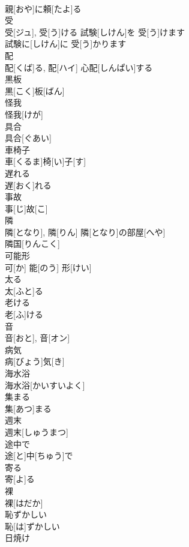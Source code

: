\documentclass[8pt]{extreport}
\begin{document}
\begin{CJK}{UTF8}{min}
\\	親[おや]に頼[たよ]る 
\\	受	
\\	受[ジュ], 受[う]ける	試験[しけん]を 受[う]けます 
\\	試験に[しけん]に 受[う]かります 
\\	配	
\\	配[くば]る, 配[ハイ]	心配[しんぱい]する　
\\	黒板	
\\	黒[こく]板[ばん]	
\\	怪我	
\\	怪我[けが]	
\\	具合	
\\	具合[ぐあい]	
\\	車椅子	
\\	車[くるま]椅[い]子[す]	
\\	遅れる	
\\	遅[おく]れる	
\\	事故	
\\	事[じ]故[こ]	
\\	隣	
\\	隣[となり], 隣[りん]	隣[となり]の部屋[へや] 
\\	隣国[りんこく] 
\\	可能形	
\\	可[か] 能[のう] 形[けい]	
\\	太る	
\\	太[ふと]る	
\\	老ける	
\\	老[ふ]ける	
\\	音	
\\	音[おと], 音[オン]	
\\	病気	
\\	病[びょう]気[き]	
\\	海水浴	
\\	海水浴[かいすいよく]	
\\	集まる	
\\	集[あつ]まる	
\\	週末	
\\	週末[しゅうまつ]	
\\	途中で	
\\	途[と]中[ちゅう]で	
\\	寄る	
\\	寄[よ]る	
\\	裸	
\\	裸[はだか]	
\\	恥ずかしい	
\\	恥[は]ずかしい	
\\	日焼け	

\end{CJK}
\end{document}
